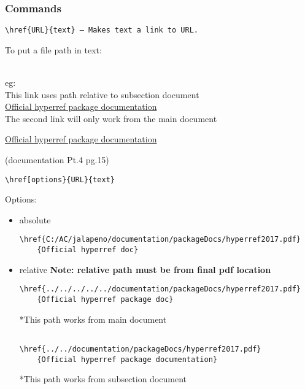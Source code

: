 \documentclass[class=article, crop=false, titlepage, twoside, multi={itemize, figure, verbatim}, float=false]{standalone}
\begin{document}
\subsubsection[Commands]{\Large Commands}
\begin{verbatim}
\href{URL}{text} — Makes text a link to URL.
\end{verbatim}

\begin{Large}To put a file path in text:\end{Large}\\
eg:\\
\ifstandalone
This link uses path relative to subsection document\\
\href{../../../../../documentation/packageDocs/hyperref2017.pdf}{Official hyperref package documentation}\\
The second link will only work from the main document
\fi

\href{../../documentation/packageDocs/hyperref2017.pdf}{Official hyperref package documentation}\\
\begin{tiny}(documentation Pt.4 pg.15)\end{tiny}
\begin{verbatim}
\href[options}{URL}{text}
\end{verbatim}

Options:\begin{itemize}
\item absolute
\begin{footnotesize}
\begin{verbatim}
\href{C:/AC/jalapeno/documentation/packageDocs/hyperref2017.pdf}
    {Official hyperref doc}
\end{verbatim}
\end{footnotesize}

\item relative \textbf{Note: relative path must be from final pdf location}
\begin{footnotesize}
\begin{verbatim}
\href{../../../../../documentation/packageDocs/hyperref2017.pdf}
    {Official hyperref package doc}
\end{verbatim}
*This path works from main document
\begin{verbatim}

\href{../../documentation/packageDocs/hyperref2017.pdf}
    {Official hyperref package documentation}
\end{verbatim}
*This path works from subsection document

\end{footnotesize}

\end{itemize}
\end{document}
